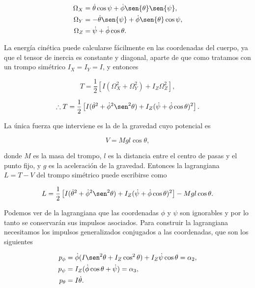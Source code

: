 \documentclass[a4paper,10pt]{article}
\numberwithin{equation}{section}
\begin{document}
\begin{align}
 \begin{split}
   \Omega_X &= \dot{\theta}\cos{\psi} + \dot{\phi}\sen{\theta}\sen{\psi}, \\
  \Omega_Y &= - \dot{\theta}\sen{\psi} + \dot{\phi}\sen{\theta}\cos{\psi}, \\
   \Omega_Z &= \dot{\psi} + \dot{\phi}\cos{\theta}.
 \end{split}
\end{align}

La energía cinética puede calcularse fácilmente en las coordenadas del cuerpo, ya que 
el tensor de inercia es constante y diagonal, aparte de que como tratamos con un 
trompo simétrico $I_X = I_Y = I$, y entonces 

\begin{equation}
 T = \frac{1}{2}[I(\Omega_X^2 + \Omega_Y^2) + I_Z\Omega_Z^2],
\end{equation}

\begin{equation}
 \therefore T = \frac{1}{2}\left[I(\dot{\theta}^2 + \dot{\phi}^2\sen^2{\theta})
 + I_Z(\dot{\psi} + \dot{\phi}\cos{\theta})^2\right].
\end{equation}

La única fuerza que interviene es la de la gravedad cuyo potencial es 

\begin{equation}
 V = Mgl\cos{\theta},
\end{equation}

donde $M$ es la masa del trompo, $l$ es la distancia entre el centro de pasas y 
el punto fijo, y $g$ es la aceleración de la gravedad. Entonces la lagrangiana 
$L = T - V$ del trompo simétrico puede escribirse como 

\begin{equation}
 L = \frac{1}{2}\left[I(\dot{\theta}^2 + \dot{\phi}^2\sen^2{\theta})
 + I_Z(\dot{\psi} + \dot{\phi}\cos{\theta})^2\right] - Mgl\cos{\theta}.
\end{equation}

Podemos ver de la lagrangiana que las coordenadas $\phi$ y $\psi$ son ignorables y 
por lo tanto se conservarán sus impulsos asociados. Para 
construir la lagrangiana necesitamos los impulsos generalizados conjugados a las 
coordenadas, que son los siguientes

\begin{align}
 p_\phi &= \dot{\phi}(I\sen^2{\theta} + I_Z\cos^2{\theta}) + I_Z\dot{\psi}\cos{\theta} = \alpha_2, \\
 p_\psi &= I_Z(\dot{\phi}\cos{\theta} + \dot{\psi}) = \alpha_3, \\
 p_\theta &= I\dot{\theta}.
\end{align}
\end{document}
